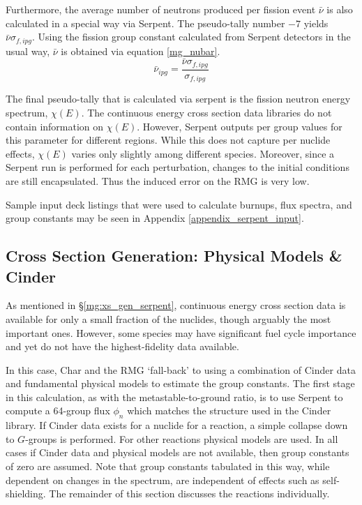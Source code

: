 Furthermore, the average number of neutrons produced per fission event $\bar{\nu}$ is also 
calculated in a special way via Serpent.  The pseudo-tally number $-7$ yields $\bar{\nu}\sigma_{f,ipg}$.
Using the fission group constant calculated from Serpent detectors in the usual way, $\bar{\nu}$
is obtained via equation \ref{mg_nubar}.
\begin{equation}
\label{mg_nubar}
\bar{\nu}_{ipg} = \frac{\bar{\nu}\sigma_{f,ipg}}{\sigma_{f,ipg}}
\end{equation}

The final pseudo-tally that is calculated via serpent is the fission neutron energy spectrum, $\chi(E)$.
The continuous energy cross section data libraries do not contain information on $\chi(E)$.  However, 
Serpent outputs per group values for this parameter for different regions.  While this does not 
capture per nuclide effects, $\chi(E)$ varies only slightly among different species.  
Moreover, since a Serpent run is performed for each perturbation, changes to 
the initial conditions are still encapsulated.  Thus the induced error on the RMG is very low.

Sample input deck listings that were used to calculate burnups, flux spectra, and group constants
may be seen in Appendix \ref{appendix_serpent_input}.

\subsection{Cross Section Generation: Physical Models \& Cinder}
\label{mg:xs_gen_physics}
As mentioned in \S \ref{mg:xs_gen_serpent}, continuous energy cross section data is available for only 
a small fraction of the nuclides, though arguably the most important ones.  However, some species 
may have significant fuel cycle importance and yet do not have the highest-fidelity data available.

In this case, Char and the RMG `fall-back' to using a combination of Cinder data and fundamental 
physical models to estimate the group constants. The first stage in this calculation, as with the 
metastable-to-ground ratio, is to use Serpent to compute a 64-group flux $\phi_n$
which matches the structure used in the Cinder library.  If Cinder data exists for a nuclide for 
a reaction, a simple collapse down to $G$-groups is performed.  For other reactions physical
models are used.  In all cases if Cinder data and physical models are not available, then group
constants of zero are assumed.  Note that group constants tabulated in this way, while dependent 
on changes in the spectrum, are independent of effects such as self-shielding.
The remainder of this section discusses the reactions individually.

